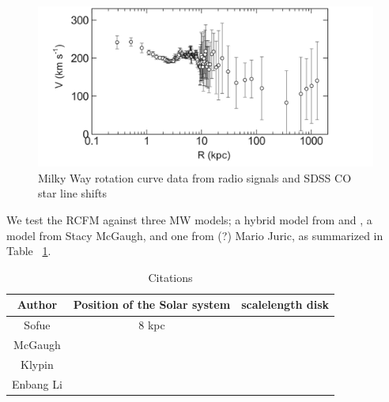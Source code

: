 \documentclass[reprint,%
 amsmath,amssymb,
 aps,
]{revtex4-1}
\begin{document}
 \begin{figure}
    \centering
    \includegraphics[width=\linewidth]{Sofue_MWtoLGData}
    \caption{Milky Way rotation curve data from radio signals and SDSS CO star line shifts  \cite{Sof11}}
    \label{fig:mwSofue}
\end{figure}


  We test the RCFM against three MW models;  a hybrid model from \citet{Xue} and \citet{Sofue}, a model from Stacy McGaugh, and one from (?) Mario Juric, as summarized in Table ~\ref{tab:my_label}.
  
   \begin{table}[h!]
      \centering
      \begin{tabular}{|c|c|c|}
      \hline
        Author & Position of the Solar system   &  scalelength disk\\
        \hline
        Sofue \cite{sofue2009unified,10.1093/pasj/61.2.153,Sof11}   & 8 kpc &\\
             \hline
        McGaugh\cite{2021DDA....5240103M} & &\\
         \hline
        Klypin&&\\
         \hline
        Enbang Li&&\\
         \hline
      \end{tabular}
      \caption{Citations}
      \label{tab:my_label}
  \end{table}
  
\end{document}

